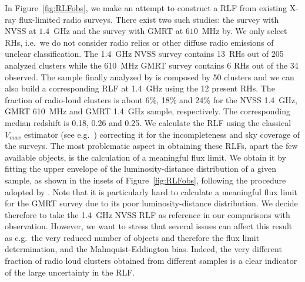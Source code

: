 \documentclass[traditabstract]{aa}
\begin{document}
\begin{appendix}
In Figure~\ref{fig:RLFobs}, we make an attempt to construct a RLF from existing X-ray flux-limited radio surveys. There exist two such studies: the \cite{1999NewA....4..141G} survey with NVSS at $1.4$~GHz and the \cite{VenturiGMRT_1,VenturiGMRT_2} survey with GMRT at $610$~MHz by. We only select RHs, i.e.~we do not consider radio relics or other diffuse radio emissions of unclear classification. The 1.4~GHz NVSS survey contains 13~RHs out of 205 analyzed clusters while the 610~MHz GMRT survey contains 6 RHs out of the 34 observed. The sample finally analyzed by \cite{VenturiGMRT_1,VenturiGMRT_2} is composed by 50 clusters and we can also build a corresponding RLF at 1.4~GHz using the 12 present RHs. The fraction of radio-loud clusters is about 6\%, 18\% and 24\% for the NVSS 1.4~GHz, GMRT 610~MHz and GMRT 1.4~GHz sample, respectively. The corresponding median redshift is 0.18, 0.26 and 0.25. We calculate the RLF using the classical $V_{max}$ estimator (see e.g.~\citealp{1976ApJ...207..700F}) correcting it for the incompleteness and sky coverage of the surveys. The most problematic aspect in obtaining these RLFs, apart the few available objects, is the calculation of a meaningful flux limit. We obtain it by fitting the upper envelope of the luminosity-distance distribution of a given sample, as shown in the insets of Figure~\ref{fig:RLFobs}, following the procedure adopted by \cite{2011arXiv1106.5494B}. Note that it is particularly hard to calculate a meaningful flux limit for the GMRT survey due to its poor luminosity-distance distribution. We decide therefore to take the 1.4~GHz NVSS RLF as reference in our comparisons with observation. However, we want to stress that several issues can affect this result as e.g.~the very reduced number of objects and therefore the flux limit determination, and the Malmquist-Eddington bias. Indeed, the very different fraction of radio loud clusters obtained from different samples is a clear indicator of the large uncertainty in the RLF.


\end{appendix}
\end{document}
